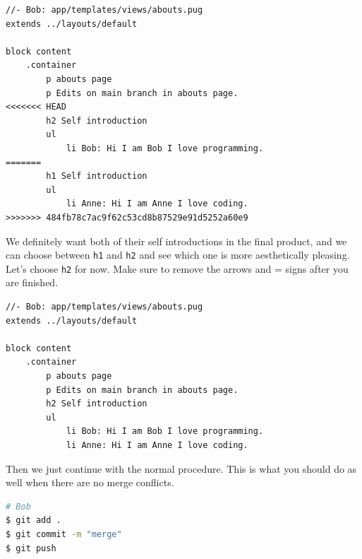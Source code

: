 \begin{lstlisting}[language=pug]
//- Bob: app/templates/views/abouts.pug
extends ../layouts/default

block content
	.container
		p abouts page
		p Edits on main branch in abouts page.
<<<<<<< HEAD
		h2 Self introduction
		ul
			li Bob: Hi I am Bob I love programming.
=======
		h1 Self introduction
		ul
			li Anne: Hi I am Anne I love coding.
>>>>>>> 484fb78c7ac9f62c53cd8b87529e91d5252a60e9
\end{lstlisting}

We definitely want both of their self introductions in the final product, and we can choose between \texttt{h1} and \texttt{h2} and see which one is more aesthetically pleasing. Let's choose \texttt{h2} for now. Make sure to remove the arrows and = signs after you are finished. 
\vspace{6mm}

\begin{lstlisting}[language=pug]
//- Bob: app/templates/views/abouts.pug
extends ../layouts/default

block content
	.container
		p abouts page
		p Edits on main branch in abouts page.
		h2 Self introduction
		ul
			li Bob: Hi I am Bob I love programming.
			li Anne: Hi I am Anne I love coding.
\end{lstlisting}
\vspace{6mm}

Then we just continue with the normal procedure. This is what you should do as well when there are no merge conflicts.
\vspace{6mm}

\begin{lstlisting}[language=bash]
# Bob
$ git add .
$ git commit -m "merge"
$ git push
\end{lstlisting}




